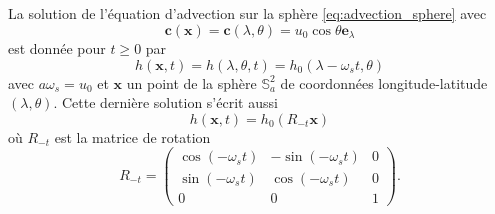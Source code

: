 \begin{proposition}
La solution de l'équation d'advection sur la sphère \eqref{eq:advection_sphere} avec
\begin{equation}
\mathbf{c}(\mathbf{x}) = \mathbf{c}(\lambda,\theta) = u_0 \cos \theta \mathbf{e}_{\lambda}
\end{equation}
est donnée pour $t \geq 0$ par
\begin{equation}
h(\mathbf{x}, t ) = h(\lambda, \theta, t ) = h_0(\lambda- \omega_s t , \theta)
\end{equation}
avec $a \omega_s = u_0$ et $\mathbf{x}$ un point de la sphère $\mathbb{S}_a^2$ de coordonnées longitude-latitude $(\lambda, \theta)$.
Cette dernière solution s'écrit aussi
\begin{equation}
h(\mathbf{x},t) = h_0(R_{-t} \mathbf{x})
\end{equation}
où $R_{-t}$ est la matrice de rotation
\begin{equation}
R_{-t} = \begin{pmatrix}
\cos (- \omega_s t) & - \sin (- \omega_s t) & 0 \\
\sin (- \omega_s t) & \cos (- \omega_s t)   & 0 \\
0 & 0 & 1
\end{pmatrix} .
\end{equation}
\end{proposition}

